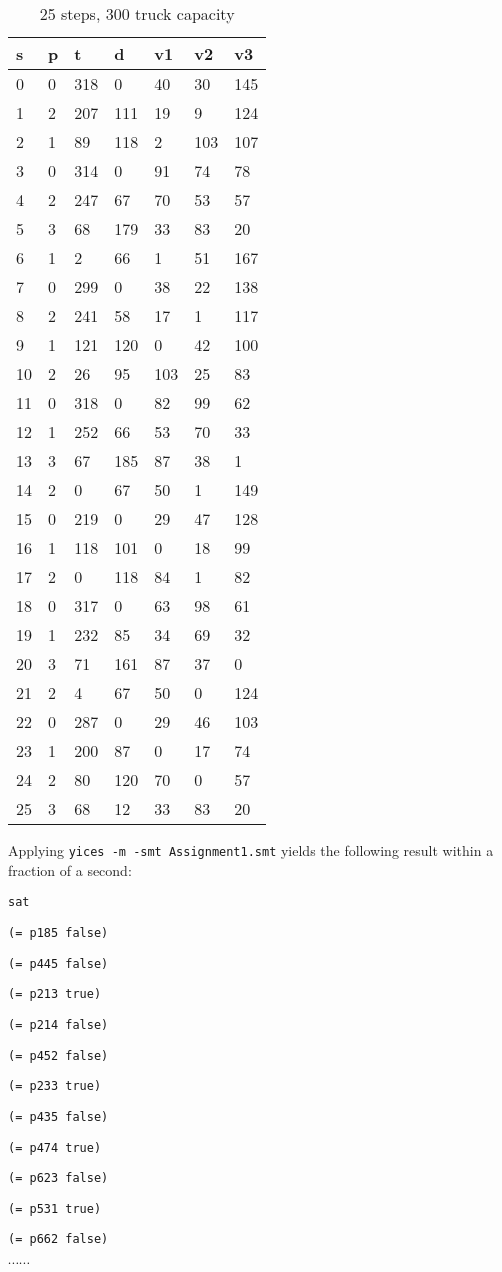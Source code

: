 \documentclass[a4paper]{article}
\begin{document}
	\begin{longtable}[c]{@{}|l|l|l|l|l|l|l|@{}}
		\caption{25 steps, 300 truck capacity}\\
		\toprule
		s & p & t & d & v1 & v2 & v3\tabularnewline
		\midrule
		\endhead
		0 & 0 & 318 & 0 & 40 & 30 & 145\tabularnewline
		1 & 2 & 207 & 111 & 19 & 9 & 124\tabularnewline
		2 & 1 & 89 & 118 & 2 & 103 & 107\tabularnewline
		3 & 0 & 314 & 0 & 91 & 74 & 78\tabularnewline
		4 & 2 & 247 & 67 & 70 & 53 & 57\tabularnewline
		\rowcolor{Highlight}
		5 & 3 & 68 & 179 & 33 & 83 & 20\tabularnewline
		6 & 1 & 2 & 66 & 1 & 51 & 167\tabularnewline
		7 & 0 & 299 & 0 & 38 & 22 & 138\tabularnewline
		8 & 2 & 241 & 58 & 17 & 1 & 117\tabularnewline
		9 & 1 & 121 & 120 & 0 & 42 & 100\tabularnewline
		10 & 2 & 26 & 95 & 103 & 25 & 83\tabularnewline
		11 & 0 & 318 & 0 & 82 & 99 & 62\tabularnewline
		12 & 1 & 252 & 66 & 53 & 70 & 33\tabularnewline
		13 & 3 & 67 & 185 & 87 & 38 & 1\tabularnewline
		14 & 2 & 0 & 67 & 50 & 1 & 149\tabularnewline
		15 & 0 & 219 & 0 & 29 & 47 & 128\tabularnewline
		16 & 1 & 118 & 101 & 0 & 18 & 99\tabularnewline
		17 & 2 & 0 & 118 & 84 & 1 & 82\tabularnewline
		18 & 0 & 317 & 0 & 63 & 98 & 61\tabularnewline
		19 & 1 & 232 & 85 & 34 & 69 & 32\tabularnewline
		20 & 3 & 71 & 161 & 87 & 37 & 0\tabularnewline
		21 & 2 & 4 & 67 & 50 & 0 & 124\tabularnewline
		22 & 0 & 287 & 0 & 29 & 46 & 103\tabularnewline
		23 & 1 & 200 & 87 & 0 & 17 & 74\tabularnewline
		24 & 2 & 80 & 120 & 70 & 0 & 57\tabularnewline
		\rowcolor{Highlight}
		25 & 3 & 68 & 12 & 33 & 83 & 20\tabularnewline
		\bottomrule
	\end{longtable}

Applying {\tt yices -m -smt Assignment1.smt} yields the following result
within a fraction of a second:

{\footnotesize

{\tt sat }

{\tt (= p185 false)}

{\tt (= p445 false)}

{\tt (= p213 true)}

{\tt (= p214 false)}

{\tt (= p452 false)}

{\tt (= p233 true)}

{\tt (= p435 false)}

{\tt (= p474 true)}

{\tt (= p623 false)}

{\tt (= p531 true)}

{\tt (= p662 false)}

$\cdots \cdots$ }
\end{document}
